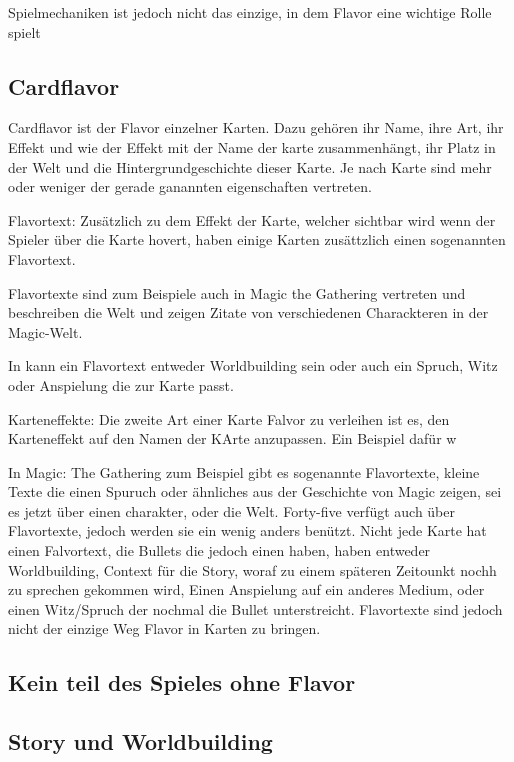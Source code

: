 Spielmechaniken ist jedoch nicht das einzige, in dem Flavor eine wichtige Rolle spielt

%
%

\subsection{Cardflavor}\label{subsec:flavour-durch-mechaniken}

Cardflavor ist der Flavor einzelner Karten.
Dazu gehören ihr Name, ihre Art, ihr Effekt und wie der Effekt mit der Name der karte zusammenhängt,
ihr Platz in der Welt und die Hintergrundgeschichte dieser Karte. Je nach Karte sind mehr oder weniger der gerade ganannten
eigenschaften vertreten.


Flavortext:
Zusätzlich zu dem Effekt der Karte, welcher sichtbar wird wenn der Spieler über die Karte hovert, haben einige Karten zusättzlich einen sogenannten Flavortext.


Flavortexte sind zum Beispiele auch in Magic the Gathering vertreten und beschreiben die Welt und zeigen Zitate von verschiedenen Charackteren in der Magic-Welt.\cite{magicarena,soulOfTheGame}%


In \FF kann ein Flavortext entweder Worldbuilding sein oder auch ein Spruch, Witz oder Anspielung die zur Karte passt.


Karteneffekte:
Die zweite Art einer Karte Falvor zu verleihen ist es, den Karteneffekt auf den Namen der KArte anzupassen. Ein Beispiel dafür w








In Magic: The Gathering zum Beispiel
gibt es sogenannte Flavortexte, kleine Texte die einen Spuruch oder ähnliches aus der Geschichte von Magic zeigen, sei es jetzt über einen charakter, oder die Welt.
Forty-five verfügt auch über Flavortexte, jedoch werden sie ein wenig anders benützt. Nicht jede Karte hat einen Falvortext,  die Bullets die jedoch einen haben, haben entweder Worldbuilding,
Context für die Story, woraf zu einem späteren Zeitounkt nochh zu sprechen gekommen wird, Einen Anspielung auf ein anderes Medium, oder einen Witz/Spruch der nochmal
die Bullet unterstreicht. Flavortexte sind jedoch nicht der einzige Weg Flavor in Karten zu bringen.


\subsection{Kein teil des Spieles ohne Flavor}\label{subsec:flavour-durch-mechaniken}

\subsection{Story und Worldbuilding}\label{subsec:flavour-durch-mechaniken}


\renewcommand{\kapitelautor}{}
